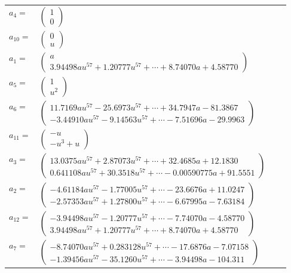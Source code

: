 \documentclass[1p]{elsarticle_modified}
\theoremstyle{definition}
\begin{document}
\begin{tabular}{m{7pt} m{180pt} m{7pt} m{180pt} }
\flushright $a_{4}=$&$\begin{pmatrix}1\\0\end{pmatrix}$ \\
\flushright $a_{10}=$&$\begin{pmatrix}0\\u\end{pmatrix}$ \\
\flushright $a_{1}=$&$\begin{pmatrix}a\\3.94498 a u^{57}+1.20777 u^{57}+\cdots+8.74070 a+4.58770\end{pmatrix}$ \\
\flushright $a_{5}=$&$\begin{pmatrix}1\\u^2\end{pmatrix}$ \\
\flushright $a_{6}=$&$\begin{pmatrix}11.7169 a u^{57}-25.6973 u^{57}+\cdots+34.7947 a-81.3867\\-3.44910 a u^{57}-9.14563 u^{57}+\cdots-7.51696 a-29.9963\end{pmatrix}$ \\
\flushright $a_{11}=$&$\begin{pmatrix}- u\\- u^3+u\end{pmatrix}$ \\
\flushright $a_{3}=$&$\begin{pmatrix}13.0375 a u^{57}+2.87073 u^{57}+\cdots+32.4685 a+12.1830\\0.641108 a u^{57}+30.3518 u^{57}+\cdots-0.00590775 a+91.5551\end{pmatrix}$ \\
\flushright $a_{2}=$&$\begin{pmatrix}-4.61184 a u^{57}-1.77005 u^{57}+\cdots-23.6676 a+11.0247\\-2.57353 a u^{57}+1.27800 u^{57}+\cdots-6.67995 a-7.63184\end{pmatrix}$ \\
\flushright $a_{12}=$&$\begin{pmatrix}-3.94498 a u^{57}-1.20777 u^{57}+\cdots-7.74070 a-4.58770\\3.94498 a u^{57}+1.20777 u^{57}+\cdots+8.74070 a+4.58770\end{pmatrix}$ \\
\flushright $a_{7}=$&$\begin{pmatrix}-8.74070 a u^{57}+0.283128 u^{57}+\cdots-17.6876 a-7.07158\\-1.39456 a u^{57}-35.1260 u^{57}+\cdots-3.94498 a-104.311\end{pmatrix}$ \\

\end{tabular}
\end{document}
